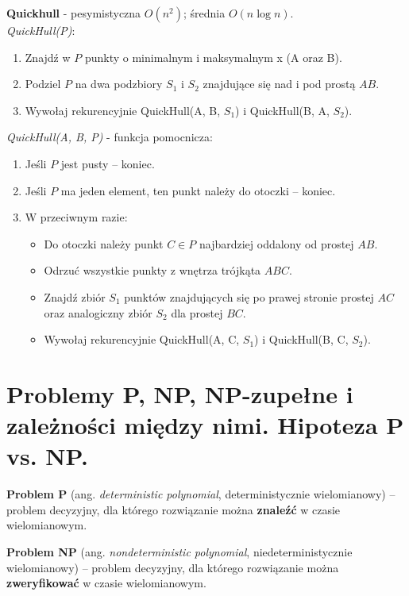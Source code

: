 \documentclass[main.tex]{subfiles}
\begin{document}
    \noindent \textbf{Quickhull} - pesymistyczna $O(n^2)$; średnia $O(n \log n)$.\\

    \noindent \textit{QuickHull(P)}:
    \begin{enumerate}[noitemsep]
        \item Znajdź w $P$ punkty o minimalnym i maksymalnym x (A oraz B).
        \item Podziel $P$ na dwa podzbiory $S_1$ i $S_2$ znajdujące się nad i pod prostą $AB$.
        \item Wywołaj rekurencyjnie QuickHull(A, B, $S_1$) i QuickHull(B, A, $S_2$).
    \end{enumerate}

    \noindent \textit{QuickHull(A, B, P)} - funkcja pomocnicza:
    \begin{enumerate}[noitemsep]
        \item Jeśli $P$ jest pusty – koniec.
        \item Jeśli $P$ ma jeden element, ten punkt należy do otoczki – koniec.
        \item W przeciwnym razie:
        \begin{itemize}[noitemsep]
            \item Do otoczki należy punkt $C \in P$ najbardziej oddalony od prostej $AB$.
            \item Odrzuć wszystkie punkty z wnętrza trójkąta $ABC$.
            \item Znajdź zbiór $S_1$ punktów znajdujących się po prawej stronie prostej $AC$ oraz analogiczny
            zbiór $S_2$ dla prostej $BC$.
            \item Wywołaj rekurencyjnie QuickHull(A, C, $S_1$) i QuickHull(B, C, $S_2$).
        \end{itemize}
    \end{enumerate}


    \section{Problemy P, NP, NP-zupełne i zależności między nimi. Hipoteza P vs. NP.}
    \begin{definition}
        \textbf{Problem P} (ang. \textit{deterministic polynomial}, deterministycznie wielomianowy) – problem decyzyjny,
        dla którego rozwiązanie można \textbf{znaleźć} w czasie wielomianowym.
    \end{definition}

    \begin{definition}
        \textbf{Problem NP} (ang. \textit{nondeterministic polynomial}, niedeterministycznie wielomianowy) – problem
        decyzyjny, dla którego rozwiązanie można \textbf{zweryfikować} w czasie wielomianowym.
    \end{definition}
\end{document}
